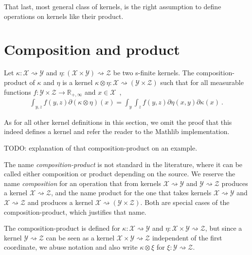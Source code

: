 That last, most general class of kernels, is the right assumption to define operations on kernels like their product.



\section{Composition and product}

\begin{definition}
  \label{def:kernel_compProd}
  \leanok
  Let $\kappa : \mathcal X \rightsquigarrow \mathcal Y$ and $\eta : (\mathcal X \times \mathcal Y) \rightsquigarrow \mathcal Z$ be two s-finite kernels.
  The composition-product of $\kappa$ and $\eta$ is a kernel $\kappa \otimes \eta : \mathcal X \rightsquigarrow (\mathcal Y \times \mathcal Z)$ such that for all measurable functions $f : \mathcal Y \times \mathcal Z \to \mathbb{R}_{+,\infty}$ and $x \in \mathcal X$~,
  \begin{align*}
  \int_{y,z} f(y,z) \partial(\kappa \otimes \eta)(x) = \int_y \int_z f(y,z) \partial\eta(x,y) \partial\kappa(x) \: .
  \end{align*}
\end{definition}

As for all other kernel definitions in this section, we omit the proof that this indeed defines a kernel and refer the reader to the Mathlib implementation.

TODO: explanation of that composition-product on an example.

The name \emph{composition-product} is not standard in the literature, where it can be called either composition or product depending on the source.
We reserve the name \emph{composition} for an operation that from kernels $\mathcal X \rightsquigarrow \mathcal Y$ and $\mathcal Y \rightsquigarrow \mathcal Z$ produces a kernel $\mathcal X \rightsquigarrow \mathcal Z$, and the name product for the one that takes kernels $\mathcal X \rightsquigarrow \mathcal Y$ and $\mathcal X \rightsquigarrow \mathcal Z$ and produces a kernel $\mathcal X \rightsquigarrow (\mathcal Y \times \mathcal Z)$.
Both are special cases of the composition-product, which justifies that name.

The composition-product is defined for $\kappa : \mathcal X \rightsquigarrow \mathcal Y$ and $\eta : \mathcal X \times \mathcal Y \rightsquigarrow \mathcal Z$, but since a kernel $\mathcal Y \rightsquigarrow \mathcal Z$ can be seen as a kernel $\mathcal X \times \mathcal Y \rightsquigarrow \mathcal Z$ independent of the first coordinate, we abuse notation and also write $\kappa \otimes \xi$ for $\xi : \mathcal Y \rightsquigarrow \mathcal Z$.

